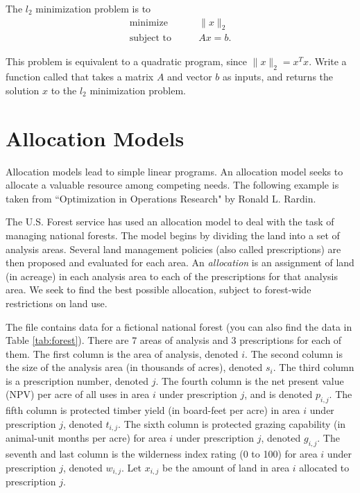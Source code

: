 \begin{problem}
The $l_2$ minimization problem is to
\begin{align*}
\text{minimize}\qquad &\|x\|_2\\
\text{subject to} \qquad &Ax = b.
\end{align*}

This problem is equivalent to a quadratic program, since $\|x\|_2 = x^Tx$.
Write a function called  that takes a matrix $A$ and vector $b$ as inputs, and returns the solution $x$ to the $l_2$ minimization problem.
\end{problem}

\section*{Allocation Models}
Allocation models lead to simple linear programs. An allocation model seeks to allocate a valuable resource among competing needs. The following example is taken from ``Optimization in Operations Research" by Ronald L. Rardin. %

The U.S. Forest service has used an allocation model to deal with the task of managing national forests. 
The model begins by dividing the land into a set of analysis areas. Several land management policies (also 
called prescriptions) are then proposed and evaluated for each area. 
An \emph{allocation} is an assignment of land (in acreage) in each analysis area to each of the 
prescriptions for that analysis area.
We seek to find the best possible allocation, subject to forest-wide restrictions on land use.

The file  contains data for a fictional national forest (you can also find the data
in Table \ref{tab:forest}). There are 7 areas of analysis and 3 prescriptions for each of them. 
The first column is the area of analysis, denoted $i$. The second column is the size of the analysis area (in thousands of acres), denoted $s_i$. The third column is a prescription number, denoted $j$. The fourth column is the net present value (NPV) per acre of all uses in area $i$ under prescription $j$, and is denoted $p_{i,j}$. The fifth column is protected timber yield (in board-feet per acre) in area $i$ under prescription $j$, denoted $t_{i,j}$. The sixth column is protected grazing capability (in animal-unit months per acre) for area $i$ under prescription $j$, denoted
$g_{i,j}$. The seventh and last column is the wilderness index rating (0 to 100) for area $i$ under prescription $j$, denoted $w_{i,j}$. Let $x_{i,j}$ be the amount of land in area $i$ allocated to prescription $j$.

